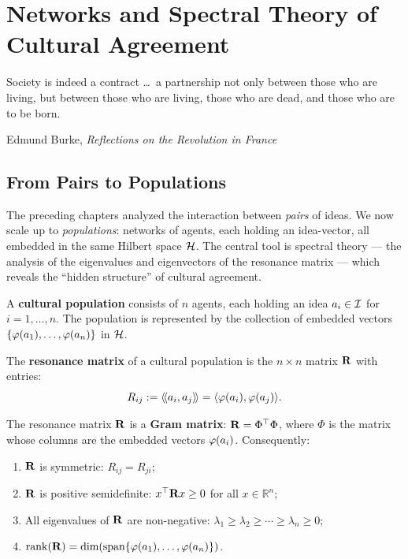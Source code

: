 \chapter{Networks and Spectral Theory of Cultural Agreement}
\label{ch:spectral}

\epigraph{Society is indeed a contract \ldots\ a partnership not only between
those who are living, but between those who are living, those who are dead, and
those who are to be born.}{Edmund Burke, \textit{Reflections on the Revolution
in France}}

\section{From Pairs to Populations}

The preceding chapters analyzed the interaction between \emph{pairs} of ideas.
We now scale up to \emph{populations}: networks of agents, each holding an
idea-vector, all embedded in the same Hilbert space $\mathcal{H}$. The central
tool is spectral theory --- the analysis of the eigenvalues and eigenvectors of
the resonance matrix --- which reveals the ``hidden structure'' of cultural
agreement.

\begin{definition}
\label{def:population}
A \textbf{cultural population} consists of $n$ agents, each holding an idea
$a_i \in \mathcal{I}$ for $i = 1, \ldots, n$. The population is represented by the
collection of embedded vectors $\{\varphi(a_1), \ldots, \varphi(a_n)\}$ in
$\mathcal{H}$.
\end{definition}

\begin{definition}
\label{def:resonance-matrix}
The \textbf{resonance matrix} of a cultural population is the $n \times n$
matrix $\mathbf{R}$ with entries:
\[
  R_{ij} := \langle\!\langle a_i, a_j \rangle\!\rangle = \langle \varphi(a_i), \varphi(a_j) \rangle.
\]
\end{definition}

\begin{theorem}
\label{thm:gram}
The resonance matrix $\mathbf{R}$ is a \textbf{Gram matrix}: $\mathbf{R} = \Phi^\top \Phi$,
where $\Phi$ is the matrix whose columns are the embedded vectors $\varphi(a_i)$.
Consequently:
\begin{enumerate}
\item $\mathbf{R}$ is symmetric: $R_{ij} = R_{ji}$;
\item $\mathbf{R}$ is positive semidefinite: $x^\top \mathbf{R} x \geq 0$ for all
$x \in \mathbb{R}^n$;
\item All eigenvalues of $\mathbf{R}$ are non-negative: $\lambda_1 \geq \lambda_2
\geq \cdots \geq \lambda_n \geq 0$;
\item $\operatorname{rank}(\mathbf{R}) = \dim(\operatorname{span}\{\varphi(a_1),
\ldots, \varphi(a_n)\})$.
\end{enumerate}
\end{theorem}

